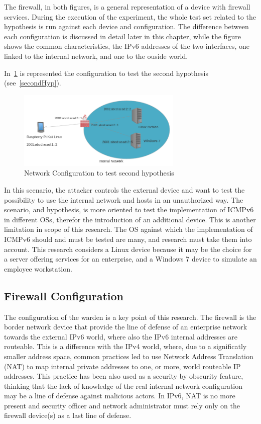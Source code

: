\documentclass[12pt]{article}
\begin{document}
The firewall, in both figures, is a general representation of a device with firewall services. During the execution of the experiment, the whole test set related to the hypothesis is run against each device and configuration. The difference between each configuration is discussed in detail later in this chapter, while the figure shows the common characteristics, the IPv6 addresses of the two interfaces, one linked to the internal network, and one to the ouside world.

In~\ref{fig:netConfiguration2} is represented the configuration to test the second hypothesis (see~\ref{secondHyp}).

\begin{figure}[ht] 
\begin{center}
\includegraphics[width=0.7\textwidth]{networkTopology2}
\caption{Network Configuration to test second hypothesis}
\label{fig:netConfiguration2}
\end{center}
\end{figure}

In this scenario, the attacker controls the external device and want to test the possibility to use the internal network and hosts in an unauthorized way. The scenario, and hypothesis, is more oriented to test the implementation of ICMPv6 in different OSs, therefor the introduction of an additional device. This is another limitation in scope of this research. The OS against which the implementation of ICMPv6 should and must be tested are many, and research must take them into account. This research considers a Linux device because it may be the choice for a server offering services for an enterprise, and a Windows 7 device to simulate an employee workstation.


\subsection{Firewall Configuration}
\label{subsection:firewallConf}

The configuration of the warden is a key point of this research. The firewall is the border network device that provide the line of defense of an enterprise network towards the external IPv6 world, where also the IPv6 internal addresses are routeable. This is a difference with the IPv4 world, where, due to a significatly smaller address space, common practices led to use Network Address Translation (NAT) to map internal private addresses to one, or more, world routeable IP addresses. This practice has been also used as a security by obscurity feature, thinking that the lack of knowledge of the real internal network configuration may be a line of defense against malicious actors. In IPv6, NAT is no more present and security officer and network administrator must rely only on the firewall device(s) as a last line of defense.
\end{document}
